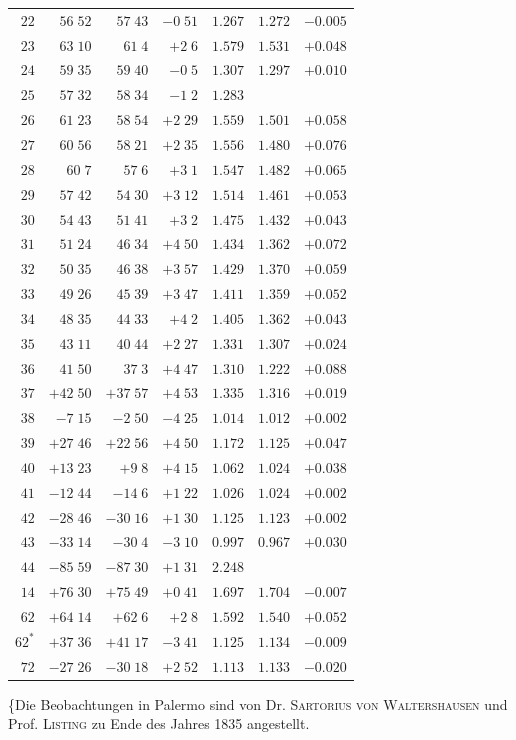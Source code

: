 \begin{center}
{\begin{tabular}{r||r|r|r||r|r|r}
$22$&$56\;52$&$57\;43$&$-0\;51$&$1.267$&$1.272$&$-0.005$\\
$23$&$63\;10$&$61\;4$&$+2\;6$&$1.579$&$1.531$&$+0.048$\\
$24$&$59\;35$&$59\;40$&$-0\;5$&$1.307$&$1.297$&$+0.010$\\
$25$&$57\;32$&$58\;34$&$-1\;2$&$1.283$&&\\
$26$&$61\;23$&$58\;54$&$+2\;29$&$1.559$&$1.501$&$+0.058$\\
$27$&$60\;56$&$58\;21$&$+2\;35$&$1.556$&$1.480$&$+0.076$\\
$28$&$60\;7$&$57\;6$&$+3\;1$&$1.547$&$1.482$&$+0.065$\\
$29$&$57\;42$&$54\;30$&$+3\;12$&$1.514$&$1.461$&$+0.053$\\
$30$&$54\;43$&$51\;41$&$+3\;2$&$1.475$&$1.432$&$+0.043$\\[2pt]
$31$&$51\;24$&$46\;34$&$+4\;50$&$1.434$&$1.362$&$+0.072$\\
$32$&$50\;35$&$46\;38$&$+3\;57$&$1.429$&$1.370$&$+0.059$\\
$33$&$49\;26$&$45\;39$&$+3\;47$&$1.411$&$1.359$&$+0.052$\\
$34$&$48\;35$&$44\;33$&$+4\;2$&$1.405$&$1.362$&$+0.043$\\
$35$&$43\;11$&$40\;44$&$+2\;27$&$1.331$&$1.307$&$+0.024$\\
$36$&$41\;50$&$37\;3$&$+4\;47$&$1.310$&$1.222$&$+0.088$\\
$37$&$+42\;50$&$+37\;57$&$+4\;53$&$1.335$&$1.316$&$+0.019$\\
$38$&$-7\;15$&$-2\;50$&$-4\;25$&$1.014$&$1.012$&$+0.002$\\
$39$&$+27\;46$&$+22\;56$&$+4\;50$&$1.172$&$1.125$&$+0.047$\\
$40$&$+13\;23$&$+9\;8$&$+4\;15$&$1.062$&$1.024$&$+0.038$\\[2pt]
$41$&$-12\;44$&$-14\;6$&$+1\;22$&$1.026$&$1.024$&$+0.002$\\
$42$&$-28\;46$&$-30\;16$&$+1\;30$&$1.125$&$1.123$&$+0.002$\\
$43$&$-33\;14$&$-30\;4$&$-3\;10$&$0.997$&$0.967$&$+0.030$\\
$44$&$-85\;59$&$-87\;30$&$+1\;31$&$2.248$&&\\[2pt]
$14$&$+76\;30$&$+75\;49$&$+0\;41$&$1.697$&$1.704$&$-0.007$\\
$62$&$+64\;14$&$+62\;6$&$+2\;8$&$1.592$&$1.540$&$+0.052$\\
$62^{*}$&$+37\;36$&$+41\;17$&$-3\;41$&$1.125$&$1.134$&$-0.009$\\
$72$&$-27\;26$&$-30\;18$&$+2\;52$&$1.113$&$1.133$&$-0.020$\\
\end{tabular}
}
\end{center}
\endgroup
\clearpage
{}
\{Die Beobachtungen in Palermo sind von Dr. \textsc{Sartorius von Waltershausen} und Prof. \textsc{Listing} zu Ende des Jahres 1835 angestellt.

